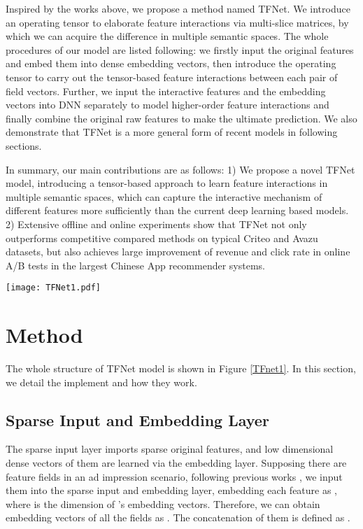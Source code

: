 \documentclass[sigconf]{acmart}
\begin{document}
Inspired by the works above, we propose a method named TFNet. We introduce an operating tensor to elaborate feature interactions via multi-slice matrices, by which we can acquire the difference in multiple semantic spaces. The whole procedures of our model are listed following: we firstly input the original features and embed them into dense embedding vectors, then introduce the operating tensor to carry out the tensor-based feature interactions between each pair of field vectors. Further, we input the interactive features and the embedding vectors into DNN separately to model higher-order feature interactions  and finally combine the original raw features to make the ultimate prediction. We also demonstrate that TFNet is a more general form of recent models in following sections. 

In summary, our main contributions are as follows: 1) We propose a novel TFNet model, introducing a tensor-based approach to learn feature interactions in multiple semantic spaces, which can capture the interactive mechanism of different features more sufficiently than the current deep learning based models. 2) Extensive offline and online experiments show that TFNet not only outperforms competitive compared methods on typical Criteo and Avazu datasets, but also achieves large improvement of revenue and click rate in online A/B tests in the largest Chinese App recommender systems. 


\begin{figure*}[t]
\setlength{\abovecaptionskip}{0pt}  \setlength{\belowcaptionskip}{0pt}  \begin{center}
   \vspace{-4mm}
   \texttt{[image: TFNet1.pdf]}
   \end{center}
\caption{The architecture of our proposed TFNet model, which consists of the following parts: sparse input layer, embedding layer, tensor-based feature interaction layer, higher-order feature interaction layer and the final output.}
   \label{TFnet1}
\end{figure*}


\section{Method}
The whole structure of TFNet model is shown in Figure \ref{TFnet1}. In this section, we detail the implement and how they work.



\subsection{Sparse Input and Embedding Layer}
The sparse input layer imports sparse original features, and low dimensional dense vectors of them are learned via the embedding layer. Supposing there are  feature fields  in an ad impression scenario, following previous works \cite{li2019fignn}, we input them into the sparse input and embedding layer, embedding each feature  as , where  is the dimension of 's embedding vectors. Therefore, we can obtain embedding vectors of all the fields as . The concatenation of them is defined as .
\end{document}
